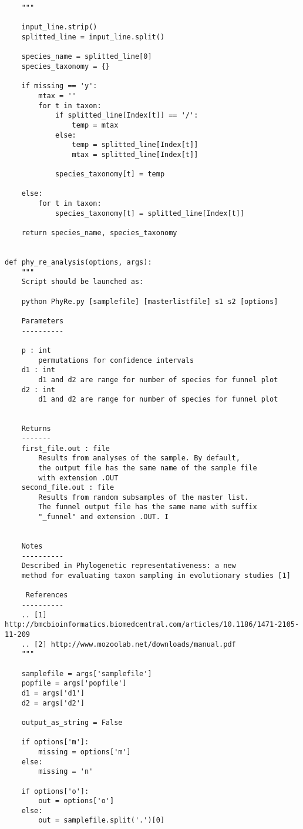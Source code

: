 \documentclass[a4paper,11pt]{article}
\begin{document}
\begin{lstlisting}
    """

    input_line.strip()
    splitted_line = input_line.split()

    species_name = splitted_line[0]
    species_taxonomy = {}

    if missing == 'y':
        mtax = ''
        for t in taxon:
            if splitted_line[Index[t]] == '/':
                temp = mtax
            else:
                temp = splitted_line[Index[t]]
                mtax = splitted_line[Index[t]]

            species_taxonomy[t] = temp

    else:
        for t in taxon:
            species_taxonomy[t] = splitted_line[Index[t]]

    return species_name, species_taxonomy


def phy_re_analysis(options, args):
    """
    Script should be launched as:

    python PhyRe.py [samplefile] [masterlistfile] s1 s2 [options]

    Parameters
    ----------

    p : int
        permutations for confidence intervals
    d1 : int
        d1 and d2 are range for number of species for funnel plot
    d2 : int
        d1 and d2 are range for number of species for funnel plot


    Returns
    -------
    first_file.out : file
        Results from analyses of the sample. By default,
        the output file has the same name of the sample file
        with extension .OUT
    second_file.out : file
        Results from random subsamples of the master list.
        The funnel output file has the same name with suffix
        "_funnel" and extension .OUT. I


    Notes
    ----------
    Described in Phylogenetic representativeness: a new
    method for evaluating taxon sampling in evolutionary studies [1]

     References
    ----------
    .. [1] http://bmcbioinformatics.biomedcentral.com/articles/10.1186/1471-2105-11-209
    .. [2] http://www.mozoolab.net/downloads/manual.pdf
    """

    samplefile = args['samplefile']
    popfile = args['popfile']
    d1 = args['d1']
    d2 = args['d2']

    output_as_string = False

    if options['m']:
        missing = options['m']
    else:
        missing = 'n'

    if options['o']:
        out = options['o']
    else:
        out = samplefile.split('.')[0]


\end{lstlisting}
\end{document}
